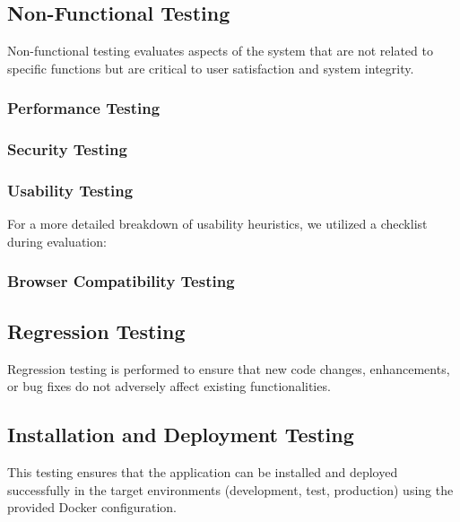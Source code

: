 \subsection{Non-Functional Testing}
Non-functional testing evaluates aspects of the system that are not related to specific functions but are critical to user satisfaction and system integrity.

\subsubsection{Performance Testing}


\subsubsection{Security Testing}


\subsubsection{Usability Testing}

For a more detailed breakdown of usability heuristics, we utilized a checklist during evaluation:


\subsubsection{Browser Compatibility Testing}


\subsection{Regression Testing}
Regression testing is performed to ensure that new code changes, enhancements, or bug fixes do not adversely affect existing functionalities.


\subsection{Installation and Deployment Testing}
This testing ensures that the application can be installed and deployed successfully in the target environments (development, test, production) using the provided Docker configuration.


